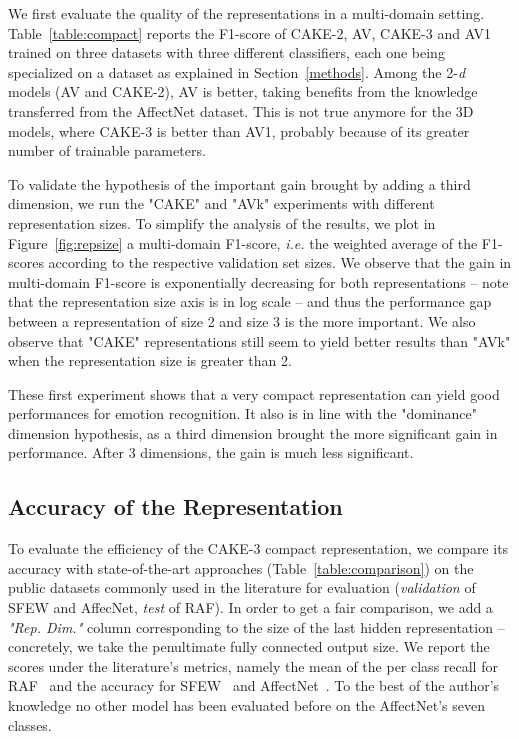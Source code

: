 \documentclass{bmvc2k}
\begin{document}
We first evaluate the quality of the representations in a multi-domain setting. Table~\ref{table:compact} reports the  F1-score of CAKE-2, AV, CAKE-3 and AV1 trained on three datasets with three different classifiers, each one being specialized on a dataset as explained in Section~\ref{methods}. Among the 2-\textit{d} models (AV and CAKE-2), AV is better, taking benefits from the knowledge transferred from the AffectNet dataset. This is not true anymore for the 3D models, where CAKE-3 is better than AV1, probably because of its greater number of trainable parameters.

To validate the hypothesis of the important gain brought by adding a third dimension, we run the "CAKE" and "AVk" experiments with different representation sizes. To simplify the analysis of the results, we plot in Figure~\ref{fig:repsize} a multi-domain F1-score, \textit{i.e.} the weighted average of the F1-scores according to the respective validation set sizes.
We observe that the gain in multi-domain F1-score is exponentially decreasing for both representations -- note that the representation size axis is in log scale -- and thus the performance gap between a representation of size 2 and size 3 is the more important. We also observe that "CAKE" representations still seem to yield better results than "AVk" when the representation size is greater than 2. 

These first experiment shows that a very compact representation can yield good performances for emotion recognition. It also is in line with the "dominance" dimension hypothesis, as a third dimension brought the more significant gain in performance. After 3 dimensions, the gain is much less significant.

\subsection{Accuracy of the Representation}
To evaluate the efficiency of the CAKE-3 compact representation, we compare its accuracy with 
state-of-the-art approaches (Table~\ref{table:comparison}) on the public datasets commonly used in the literature for evaluation (\textit{validation} of SFEW and AffecNet, \textit{test} of RAF). In order to get a fair comparison, we add a \textit{"Rep. Dim."} column corresponding to the size of the last hidden representation -- concretely, we take the penultimate fully connected output size.
We report the scores under the literature's metrics, namely the mean of the per class recall for RAF~\cite{li_reliable_2017} and the accuracy for SFEW~\cite{dhall_static_2011} and AffectNet~\cite{mollahosseini_affectnet:_2017}. To the best of the author's knowledge no other model has been evaluated before on the AffectNet's seven classes.
\end{document}
